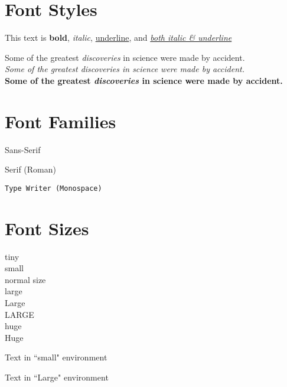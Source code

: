 \documentclass{article}
\begin{document}
\section{Font Styles}

This text is \textbf{bold},
\textit{italic},
\underline{underline}, and
\textit{\underline{both italic \& underline}}


Some of the greatest \emph{discoveries} in science
were made by accident.\\
\textit{Some of the greatest \emph{discoveries}
in science were made by accident.}\\
\textbf{Some of the greatest \emph{discoveries}
in science were made by accident.}



\section{Font Families}

\textsf{Sans-Serif}

\textrm{Serif (Roman)}

\texttt{Type Writer (Monospace)}



\section{Font Sizes}

{\tiny tiny}\\
{\small small}\\
{\normalsize normal size}\\
{\large large}\\
{\Large Large}\\
{\LARGE LARGE}\\
{\huge huge}\\
{\Huge Huge}

\begin{small}
    Text in ``small" environment
\end{small}

\begin{Large}
    Text in ``Large" environment
\end{Large}
\end{document}
